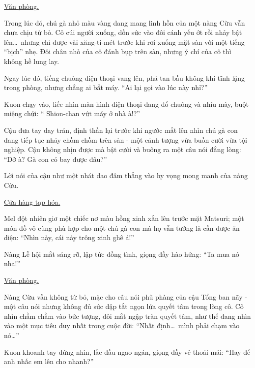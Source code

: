 \documentclass[../main.tex]{subfiles}
\begin{document}
\begin{center}
  \uline{Văn phòng.}
\end{center}

Trong lúc đó, chú gà nhỏ màu vàng đang mang linh hồn của một nàng Cừu vẫn chưa chịu từ bỏ. Cô cúi người xuống, dồn sức vào đôi cánh yếu ớt rồi nhảy bật lên\dots\ nhưng chỉ được vài xăng-ti-mét trước khi rơi xuống mặt sàn với một tiếng ``bịch'' nhẹ. Đôi chân nhỏ của cô đánh bụp trên sàn, nhưng ý chí của cô thì không hề lung lay.

Ngay lúc đó, tiếng chuông điện thoại vang lên, phá tan bầu không khí tĩnh lặng trong phòng, nhưng chẳng ai bắt máy. ``Ai lại gọi vào lúc này nhỉ?''

Kuon chạy vào, liếc nhìn màn hình điện thoại đang đổ chuông và nhíu mày, buột miệng chửi: `` Shion-chan vứt máy ở nhà à!?''

Cậu đưa tay day trán, định thần lại trước khi ngước mắt lên nhìn chú gà con đang tiếp tục nhảy chồm chồm trên sàn - một cảnh tượng vừa buồn cười vừa tội nghiệp. Cậu không nhịn được mà bật cười và buông ra một câu nói đắng lòng: ``Dở à? Gà con có bay được đâu?''

Lời nói của cậu như một nhát dao đâm thẳng vào hy vọng mong manh của nàng Cừu.

\begin{center}
  \uline{Cửa hàng tạp hóa.}
\end{center}

Mel đột nhiên giơ một chiếc nơ màu hồng xinh xắn lên trước mặt Matsuri; một món đồ vô cùng phù hợp cho một chú gà con mà họ vẫn tưởng là cần được ăn diện: ``Nhìn này, cái này trông xinh ghê á!''


Nàng Lễ hội mắt sáng rỡ, lập tức đồng tình, giọng đầy hào hứng: ``Ta mua nó nha!''

\begin{center}
  \uline{Văn phòng.}
\end{center}

Nàng Cừu vẫn không từ bỏ, mặc cho câu nói phũ phàng của cậu Tổng ban nãy - một câu nói nhưng không đủ sức dập tắt ngọn lửa quyết tâm trong lòng cô. Cô nhìn chằm chằm vào bức tượng, đôi mắt ngập tràn quyết tâm, như thể đang nhìn vào một mục tiêu duy nhất trong cuộc đời: ``Nhất định\dots\ mình phải chạm vào nó\dots''

Kuon khoanh tay đứng nhìn, lắc đầu ngao ngán, giọng đầy vẻ thoải mái: ``Hay để anh nhấc em lên cho nhanh?''
\end{document}
